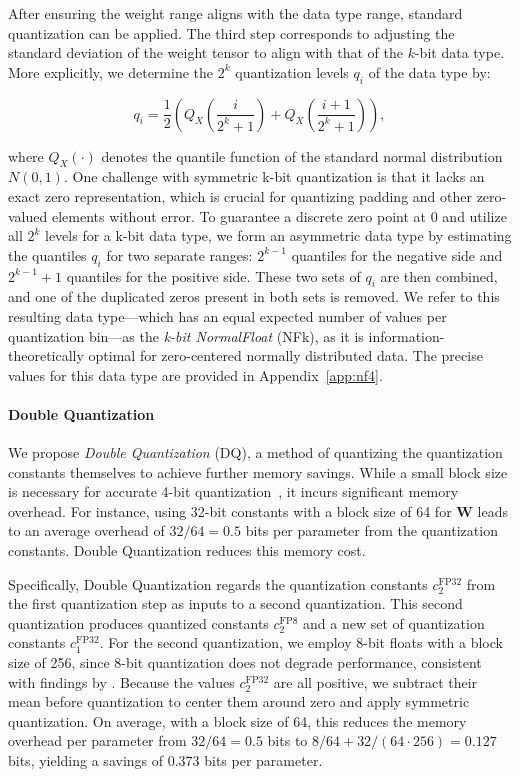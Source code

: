 After ensuring the weight range aligns with the data type range, standard quantization can be applied. The third step corresponds to adjusting the standard deviation of the weight tensor to align with that of the $k$-bit data type. More explicitly, we determine the $2^k$ quantization levels $q_i$ of the data type by:

\begin{equation}
q_i  = \frac{1}{2}\left( Q_X\left(\frac{i}{2^k+1}\right) + Q_X\left(\frac{i+1}{2^k+1}\right)\right),
\end{equation}

where $Q_X(\cdot)$ denotes the quantile function of the standard normal distribution $N(0,1)$. One challenge with symmetric k-bit quantization is that it lacks an exact zero representation, which is crucial for quantizing padding and other zero-valued elements without error. To guarantee a discrete zero point at $0$ and utilize all $2^k$ levels for a k-bit data type, we form an asymmetric data type by estimating the quantiles $q_i$ for two separate ranges: $2^{k-1}$ quantiles for the negative side and $2^{k-1}+1$ quantiles for the positive side. These two sets of $q_i$ are then combined, and one of the duplicated zeros present in both sets is removed. We refer to this resulting data type—which has an equal expected number of values per quantization bin—as the \emph{k-bit NormalFloat} (NFk), as it is information-theoretically optimal for zero-centered normally distributed data. The precise values for this data type are provided in Appendix~\ref{app:nf4}.

\paragraph{Double Quantization{}}
We propose \emph{Double Quantization} (DQ), a method of quantizing the quantization constants themselves to achieve further memory savings. While a small block size is necessary for accurate 4-bit quantization~\citep{dettmers2022case}, it incurs significant memory overhead. For instance, using 32-bit constants with a block size of 64 for $\mathbf{W}$ leads to an average overhead of $32/64 = 0.5$ bits per parameter from the quantization constants. Double Quantization reduces this memory cost.

Specifically, Double Quantization regards the quantization constants $c_2^{\text{FP32}}$ from the first quantization step as inputs to a second quantization. This second quantization produces quantized constants $c_2^{\text{FP8}}$ and a new set of quantization constants $c_1^{\text{FP32}}$. For the second quantization, we employ 8-bit floats with a block size of 256, since 8-bit quantization does not degrade performance, consistent with findings by \citet{dettmers2022case}. Because the values $c_2^{\text{FP32}}$ are all positive, we subtract their mean before quantization to center them around zero and apply symmetric quantization. On average, with a block size of 64, this reduces the memory overhead per parameter from $32/64=0.5$ bits to $8/64 + 32/(64 \cdot 256) = 0.127$ bits, yielding a savings of 0.373 bits per parameter.

